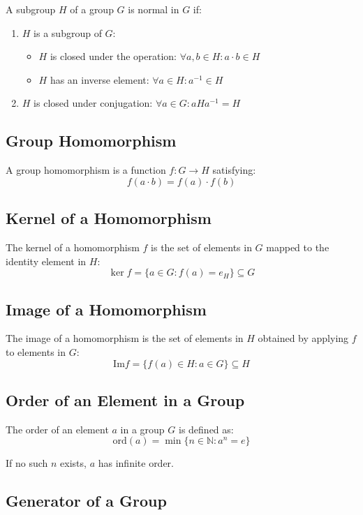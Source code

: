\documentclass{article}
\begin{document}
A subgroup \( H \) of a group \( G \) is normal in \( G \) if:
\begin{enumerate}
    \item \( H \) is a subgroup of \( G \):
    \begin{itemize}
        \item \( H \) is closed under the operation: \( \forall a, b \in H: a \cdot b \in H \)
        \item \( H \) has an inverse element: \( \forall a \in H: a^{-1} \in H \)
    \end{itemize}
    \item \( H \) is closed under conjugation: \( \forall a \in G: aHa^{-1} = H \)
\end{enumerate}

\subsection{Group Homomorphism}

A group homomorphism is a function \( f: G \to H \) satisfying:
\[ f(a \cdot b) = f(a) \cdot f(b) \]

\subsection{Kernel of a Homomorphism}

The kernel of a homomorphism \( f \) is the set of elements in \( G \) mapped to the identity element in \( H \):
\[ \ker f = \{ a \in G : f(a) = e_H \} \subseteq G \]

\subsection{Image of a Homomorphism}

The image of a homomorphism is the set of elements in \( H \) obtained by applying \( f \) to elements in \( G \):
\[ \text{Im} f = \{ f(a) \in H : a \in G \} \subseteq H \]

\subsection{Order of an Element in a Group}

The order of an element \( a \) in a group \( G \) is defined as:
\[ \text{ord}(a) = \min\{ n \in \mathbb{N} : a^n = e \} \]

If no such \( n \) exists, \( a \) has infinite order.

\subsection{Generator of a Group}
\end{document}
